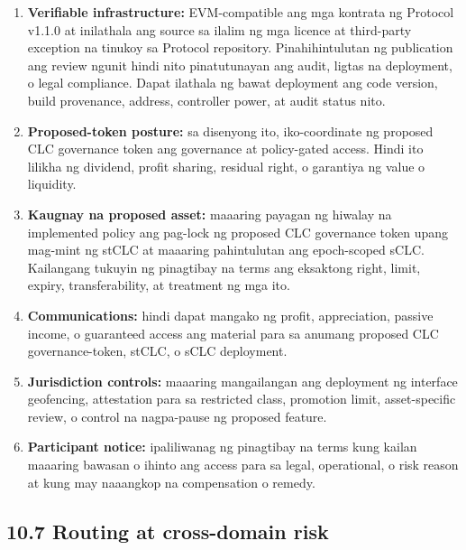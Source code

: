 \documentclass[11pt]{article}
\begin{document}
\begin{enumerate}[leftmargin=*]
\item \textbf{Verifiable infrastructure:} EVM-compatible ang mga kontrata ng Protocol v1.1.0 at inilathala ang source sa ilalim ng mga licence at third-party exception na tinukoy sa Protocol repository. Pinahihintulutan ng publication ang review ngunit hindi nito pinatutunayan ang audit, ligtas na deployment, o legal compliance. Dapat ilathala ng bawat deployment ang code version, build provenance, address, controller power, at audit status nito.
\item \textbf{Proposed-token posture:} sa disenyong ito, iko-coordinate ng proposed CLC governance token ang governance at policy-gated access. Hindi ito lilikha ng dividend, profit sharing, residual right, o garantiya ng value o liquidity.
\item \textbf{Kaugnay na proposed asset:} maaaring payagan ng hiwalay na implemented policy ang pag-lock ng proposed CLC governance token upang mag-mint ng stCLC at maaaring pahintulutan ang epoch-scoped sCLC. Kailangang tukuyin ng pinagtibay na terms ang eksaktong right, limit, expiry, transferability, at treatment ng mga ito.
\item \textbf{Communications:} hindi dapat mangako ng profit, appreciation, passive income, o guaranteed access ang material para sa anumang proposed CLC governance-token, stCLC, o sCLC deployment.
\item \textbf{Jurisdiction controls:} maaaring mangailangan ang deployment ng interface geofencing, attestation para sa restricted class, promotion limit, asset-specific review, o control na nagpa-pause ng proposed feature.
\item \textbf{Participant notice:} ipaliliwanag ng pinagtibay na terms kung kailan maaaring bawasan o ihinto ang access para sa legal, operational, o risk reason at kung may naaangkop na compensation o remedy.
\end{enumerate}
\subsection*{10.7 Routing at cross-domain risk}
\end{document}
